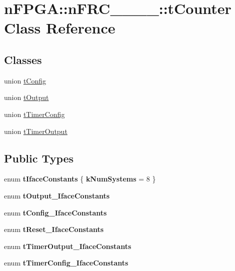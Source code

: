 \hypertarget{classnFPGA_1_1nFRC__2012__1__6__4_1_1tCounter}{
\section{nFPGA::nFRC\_\_\_\_::tCounter Class Reference}
\label{classnFPGA_1_1nFRC__2012__1__6__4_1_1tCounter}
}
\subsection*{Classes}
\begin{DoxyCompactItemize}
\item 
union \hyperlink{unionnFPGA_1_1nFRC__2012__1__6__4_1_1tCounter_1_1tConfig}{tConfig}
\item 
union \hyperlink{unionnFPGA_1_1nFRC__2012__1__6__4_1_1tCounter_1_1tOutput}{tOutput}
\item 
union \hyperlink{unionnFPGA_1_1nFRC__2012__1__6__4_1_1tCounter_1_1tTimerConfig}{tTimerConfig}
\item 
union \hyperlink{unionnFPGA_1_1nFRC__2012__1__6__4_1_1tCounter_1_1tTimerOutput}{tTimerOutput}
\end{DoxyCompactItemize}
\subsection*{Public Types}
\begin{DoxyCompactItemize}
\item 
enum {\bfseries tIfaceConstants} \{ {\bfseries kNumSystems} =  8
 \}
\item 
enum {\bfseries tOutput\_\-IfaceConstants} 
\item 
enum {\bfseries tConfig\_\-IfaceConstants} 
\item 
enum {\bfseries tReset\_\-IfaceConstants} 
\item 
enum {\bfseries tTimerOutput\_\-IfaceConstants} 
\item 
enum {\bfseries tTimerConfig\_\-IfaceConstants} 
\end{DoxyCompactItemize}
